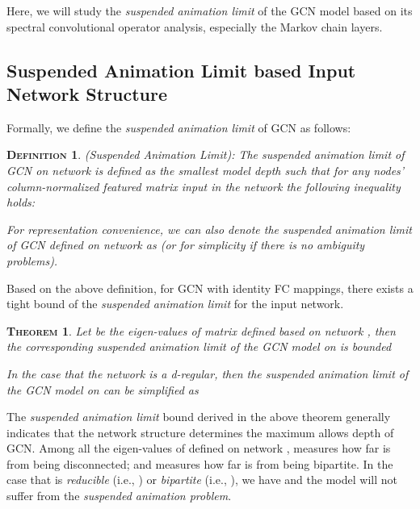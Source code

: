 \documentclass{article}
\newtheorem{definition}{\textsc{Definition}}
\newtheorem{theo}{\textsc{Theorem}}
\newcommand{\gcn}{\textsc{GCN}}
\begin{document}
Here, we will study the \textit{suspended animation limit} of the {\gcn} model based on its spectral convolutional operator analysis, especially the Markov chain layers. 

\vspace{-8pt}
\subsection{Suspended Animation Limit based Input Network Structure}
\vspace{-8pt}

Formally, we define the \textit{suspended animation limit} of {\gcn} as follows:

\begin{definition}
(Suspended Animation Limit): The \textit{suspended animation limit} of {\gcn} on network  is defined as the smallest model depth  such that for any nodes' column-normalized featured matrix input  in the network  the following inequality holds:

For representation convenience, we can also denote the \textit{suspended animation limit} of {\gcn} defined on network  as  (or  for simplicity if there is no ambiguity problems).
\end{definition}

Based on the above definition, for {\gcn} with identity FC mappings, there exists a tight bound of the \textit{suspended animation limit} for the input network.

\begin{theo}\label{theo:limit}
Let  be the eigen-values of matrix  defined based on network , then the corresponding \textit{suspended animation limit} of the {\gcn} model on  is bounded

In the case that the network  is a \textit{d-regular}, then the \textit{suspended animation limit} of the {\gcn} model on  can be simplified as

\end{theo}

The \textit{suspended animation limit} bound derived in the above theorem generally indicates that the network structure  determines the maximum allows depth of {\gcn}. Among all the eigen-values of  defined on network ,  measures how far  is from being disconnected; and  measures how far  is from being bipartite. In the case that  is \textit{reducible} (i.e., ) or \textit{bipartite} (i.e., ), we have  and the model will not suffer from the \textit{suspended animation problem}.
\end{document}
